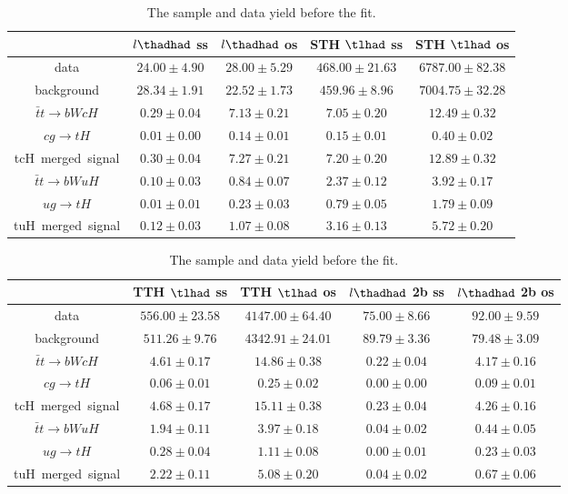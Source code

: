 \begin{table}
\footnotesize
\caption{The sample and data yield before the fit.}
\centering
\begin{tabular}{|c|c|c|c|c|} \hline
 & $l\thadhad$ ss & $l\thadhad$ os & STH $\tlhad$ ss & STH $\tlhad$ os\\\hline
data & $24.00\pm4.90$ & $28.00\pm5.29$ & $468.00\pm21.63$ & $6787.00\pm82.38$\\\hline
background & $28.34\pm1.91$ & $22.52\pm1.73$ & $459.96\pm8.96$ & $7004.75\pm32.28$\\\hline
$\bar{t}t\to bWcH$ & $0.29\pm0.04$ & $7.13\pm0.21$ & $7.05\pm0.20$ & $12.49\pm0.32$\\\hline
$cg\to tH$ & $0.01\pm0.00$ & $0.14\pm0.01$ & $0.15\pm0.01$ & $0.40\pm0.02$\\\hline
tcH~merged~signal & $0.30\pm0.04$ & $7.27\pm0.21$ & $7.20\pm0.20$ & $12.89\pm0.32$\\\hline
$\bar{t}t\to bWuH$ & $0.10\pm0.03$ & $0.84\pm0.07$ & $2.37\pm0.12$ & $3.92\pm0.17$\\\hline
$ug\to tH$ & $0.01\pm0.01$ & $0.23\pm0.03$ & $0.79\pm0.05$ & $1.79\pm0.09$\\\hline
tuH~merged~signal & $0.12\pm0.03$ & $1.07\pm0.08$ & $3.16\pm0.13$ & $5.72\pm0.20$\\\hline
\end{tabular}
\begin{tabular}{|c|c|c|c|c|} \hline
 & TTH $\tlhad$ ss & TTH $\tlhad$ os & $l\thadhad$ 2b ss & $l\thadhad$ 2b os\\\hline
data & $556.00\pm23.58$ & $4147.00\pm64.40$ & $75.00\pm8.66$ & $92.00\pm9.59$\\\hline
background & $511.26\pm9.76$ & $4342.91\pm24.01$ & $89.79\pm3.36$ & $79.48\pm3.09$\\\hline
$\bar{t}t\to bWcH$ & $4.61\pm0.17$ & $14.86\pm0.38$ & $0.22\pm0.04$ & $4.17\pm0.16$\\\hline
$cg\to tH$ & $0.06\pm0.01$ & $0.25\pm0.02$ & $0.00\pm0.00$ & $0.09\pm0.01$\\\hline
tcH~merged~signal & $4.68\pm0.17$ & $15.11\pm0.38$ & $0.23\pm0.04$ & $4.26\pm0.16$\\\hline
$\bar{t}t\to bWuH$ & $1.94\pm0.11$ & $3.97\pm0.18$ & $0.04\pm0.02$ & $0.44\pm0.05$\\\hline
$ug\to tH$ & $0.28\pm0.04$ & $1.11\pm0.08$ & $0.00\pm0.01$ & $0.23\pm0.03$\\\hline
tuH~merged~signal & $2.22\pm0.11$ & $5.08\pm0.20$ & $0.04\pm0.02$ & $0.67\pm0.06$\\\hline

\end{tabular}
\end{table}
